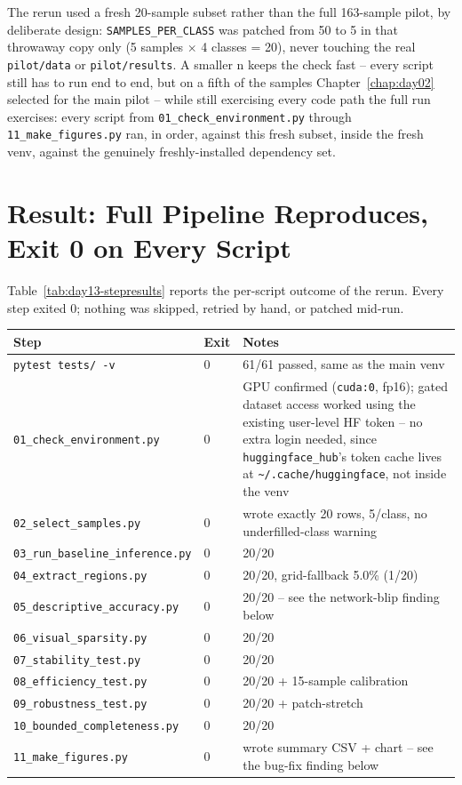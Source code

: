 The rerun used a fresh 20-sample subset rather than the full 163-sample pilot, by deliberate design:
\texttt{SAMPLES\_PER\_CLASS} was patched from 50 to 5 in that throwaway copy only (5 samples
$\times$ 4 classes = 20), never touching the real \texttt{pilot/data} or \texttt{pilot/results}. A
smaller n keeps the check fast -- every script still has to run end to end, but on a fifth of the
samples Chapter~\ref{chap:day02} selected for the main pilot -- while still exercising every code
path the full run exercises: every script from \texttt{01\_check\_environment.py} through
\texttt{11\_make\_figures.py} ran, in order, against this fresh subset, inside the fresh venv,
against the genuinely freshly-installed dependency set.

\section{Result: Full Pipeline Reproduces, Exit 0 on Every Script}

Table~\ref{tab:day13-stepresults} reports the per-script outcome of the rerun. Every step exited
0; nothing was skipped, retried by hand, or patched mid-run.

\begin{center}
\begin{tabular}{p{4.6cm}p{1.3cm}p{7.0cm}}
\toprule
\textbf{Step} & \textbf{Exit} & \textbf{Notes} \\
\midrule
\texttt{pytest tests/ -v} & 0 & 61/61 passed, same as the main venv \\
\texttt{01\_check\_environment.py} & 0 & GPU confirmed (\texttt{cuda:0}, fp16); gated dataset access
worked using the existing user-level HF token -- no extra login needed, since
\texttt{huggingface\_hub}'s token cache lives at \texttt{\textasciitilde/.cache/huggingface}, not
inside the venv \\
\texttt{02\_select\_samples.py} & 0 & wrote exactly 20 rows, 5/class, no underfilled-class warning \\
\texttt{03\_run\_baseline\_inference.py} & 0 & 20/20 \\
\texttt{04\_extract\_regions.py} & 0 & 20/20, grid-fallback 5.0\% (1/20) \\
\texttt{05\_descriptive\_accuracy.py} & 0 & 20/20 -- see the network-blip finding below \\
\texttt{06\_visual\_sparsity.py} & 0 & 20/20 \\
\texttt{07\_stability\_test.py} & 0 & 20/20 \\
\texttt{08\_efficiency\_test.py} & 0 & 20/20 + 15-sample calibration \\
\texttt{09\_robustness\_test.py} & 0 & 20/20 + patch-stretch \\
\texttt{10\_bounded\_completeness.py} & 0 & 20/20 \\
\texttt{11\_make\_figures.py} & 0 & wrote summary CSV + chart -- see the bug-fix finding below \\
\bottomrule
\end{tabular}
\label{tab:day13-stepresults}
\end{center}

